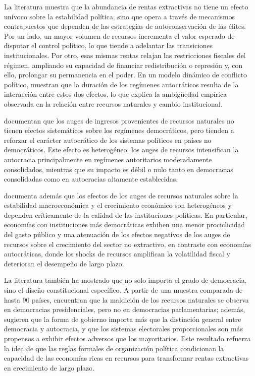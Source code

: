 \documentclass[../../PTFM.tex]{subfiles}
\begin{document}
	La literatura muestra que la abundancia de rentas extractivas no tiene un efecto unívoco sobre la estabilidad política, sino que opera a través de mecanismos contrapuestos que dependen de las estrategias de autoconservación de las élites. Por un lado, un mayor volumen de recursos incrementa el valor esperado de disputar el control político, lo que tiende a adelantar las transiciones institucionales. Por otro, esas mismas rentas relajan las restricciones fiscales del régimen, ampliando su capacidad de financiar redistribución o represión y, con ello, prolongar su permanencia en el poder. En un modelo dinámico de conflicto político, \textcite{Boucekkine2016} muestran que la duración de los regímenes autocráticos resulta de la interacción entre estos dos efectos, lo que explica la ambigüedad empírica observada en la relación entre recursos naturales y cambio institucional.
	
	\textcite{Caselli2015} documentan que los auges de ingresos provenientes de recursos naturales no tienen efectos sistemáticos sobre los regímenes democráticos, pero tienden a reforzar el carácter autocrático de los sistemas políticos en países no democráticos. Este efecto es heterogéneo: los auges de recursos intensifican la autocracia principalmente en regímenes autoritarios moderadamente consolidados, mientras que su impacto es débil o nulo tanto en democracias consolidadas como en autocracias altamente establecidas.
	
	\textcite{Arezki2012} documenta además que los efectos de los auges de recursos naturales sobre la estabilidad macroeconómica y el crecimiento económico son heterogéneos y dependen críticamente de la calidad de las instituciones políticas. En particular, economías con instituciones más democráticas exhiben una menor prociclicidad del gasto público y una atenuación de los efectos negativos de los auges de recursos sobre el crecimiento del sector no extractivo, en contraste con economías autocráticas, donde los shocks de recursos amplifican la volatilidad fiscal y deterioran el desempeño de largo plazo.
	
	La literatura también ha mostrado que no solo importa el grado de democracia, sino el diseño constitucional específico. A partir de una muestra comparada de hasta 90 países, \textcite{Andersen2008} encuentran que la maldición de los recursos naturales se observa en democracias presidenciales, pero no en democracias parlamentarias; además, sugieren que la forma de gobierno importa más que la distinción general entre democracia y autocracia, y que los sistemas electorales proporcionales son más propensos a exhibir efectos adversos que los mayoritarios. Este resultado refuerza la idea de que las reglas formales de organización política condicionan la capacidad de las economías ricas en recursos para transformar rentas extractivas en crecimiento de largo plazo.
	
\end{document}

